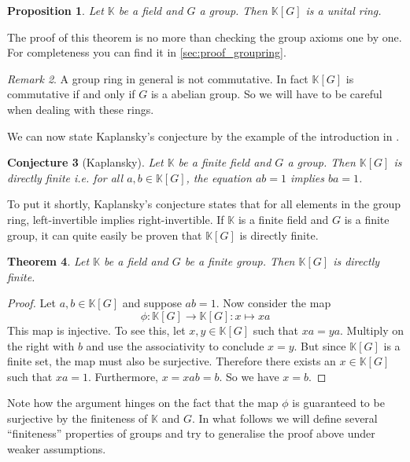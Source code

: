 \documentclass[titlepage, a4paper]{article}
\newtheorem{theorem}{Theorem}[section]
\newtheorem{proposition}[theorem]{Proposition}
\newtheorem{conjecture}[theorem]{Conjecture}
\theoremstyle{remark}
\newtheorem{remark}[theorem]{Remark}
\begin{document}
\begin{proposition}
    Let $\mathbb K$ be a field and $G$ a group. Then $\mathbb K[G]$ is a unital ring.
\end{proposition}
The proof of this theorem is no more than checking the group axioms one by one. For completeness you can find it in \cref{sec:proof_groupring}.

\begin{remark}
	A group ring in general is not commutative. In fact $\mathbb{K}[G]$ is commutative if and only if $G$ is a abelian group. So we will have to be careful when dealing with these rings. 
\end{remark}

We can now state Kaplansky's conjecture by the example of the introduction in \cite{elek_szabo_2003}.

\begin{conjecture}[Kaplansky]
	Let $\mathbb K$ be a finite field and $G$ a group. Then $\mathbb K[G]$ is directly finite i.e. for all $a, b \in \mathbb K[G]$, the equation $ab=1$ implies $ba=1$.
\end{conjecture}

To put it shortly, Kaplansky's conjecture states that for all elements in the group ring, left-invertible implies right-invertible. If $\mathbb K$ is a finite field and $G$ is a finite group, it can quite easily be proven that $\mathbb K[G]$ is directly finite.

\begin{theorem}
    Let $\mathbb K$ be a field and $G$ be a finite group. Then $\mathbb K[G]$ is directly finite. %
\end{theorem}
\begin{proof}
    Let $a, b \in \mathbb K[G]$ and suppose $ab=1$. Now consider the map
    \[
        \phi: \mathbb K[G] \to \mathbb K[G]: x \mapsto x a
    \]
    This map is injective. To see this, let $x, y \in \mathbb K[G]$ such that $xa=ya$. Multiply on the right with $b$ and use the associativity to conclude $x=y$.
    But since $\mathbb K[G]$ is a finite set, the map must also be surjective. Therefore there exists an $x \in \mathbb K[G]$ such that $x a = 1$. Furthermore, $x = xab = b$. So we have $x = b$.
\end{proof}

Note how the argument hinges on the fact that the map $\phi$ is guaranteed to be surjective by the finiteness of $\mathbb K$ and $G$. In what follows we will define several ``finiteness'' properties of groups and try to generalise the proof above under weaker assumptions.
\end{document}
